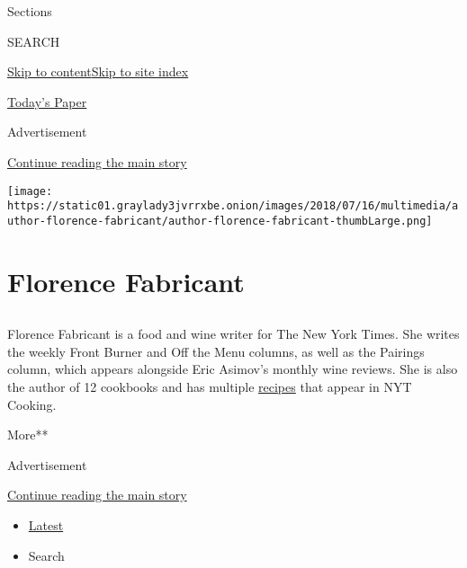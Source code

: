 Sections

SEARCH

\protect\hyperlink{site-content}{Skip to
content}\protect\hyperlink{site-index}{Skip to site index}

\href{https://myaccount.nytimes3xbfgragh.onion/auth/login?response_type=cookie\&client_id=vi}{}

\href{https://www.nytimes3xbfgragh.onion/section/todayspaper}{Today's
Paper}

Advertisement

\protect\hyperlink{after-top}{Continue reading the main story}

\texttt{[image: https://static01.graylady3jvrrxbe.onion/images/2018/07/16/multimedia/author-florence-fabricant/author-florence-fabricant-thumbLarge.png]}

\hypertarget{florence-fabricant}{%
\section{Florence Fabricant}\label{florence-fabricant}}

\subsection{}

Florence Fabricant is a food and wine writer for The New York Times. She
writes the weekly Front Burner and Off the Menu columns, as well as the
Pairings column, which appears alongside Eric Asimov's monthly wine
reviews. She is also the author of 12 cookbooks and has multiple
\href{https://cooking.nytimes3xbfgragh.onion/ourcooks/florence-fabricant/my-recipes}{recipes}
that appear in NYT Cooking.

More**

Advertisement

\protect\hyperlink{after-mid1}{Continue reading the main story}

\begin{itemize}
\tightlist
\item
  \protect\hyperlink{stream-panel}{Latest}
\item
  Search
\end{itemize}

